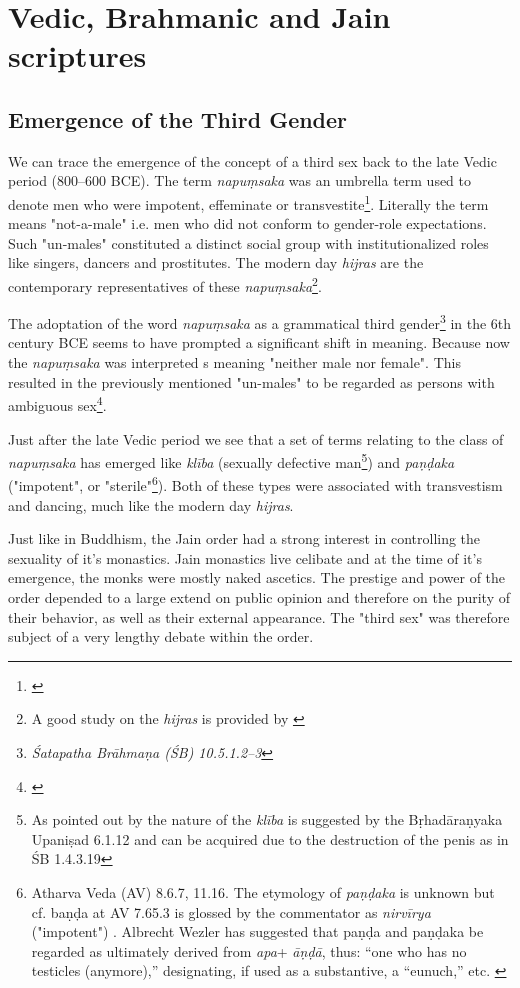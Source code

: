 \section{Vedic, Brahmanic and Jain scriptures}

\subsection{Emergence of the Third Gender}
We can trace the emergence of the concept of a third sex back to the late Vedic period (800–600 BCE). The term {\em napuṃsaka} was an umbrella term used to denote men who were impotent, effeminate or transvestite\footnote{\cite{zwilling}}. Literally the term means "not-a-male" i.e. men who did not conform to gender-role expectations. Such "un-males" constituted a distinct social group with institutionalized roles like singers, dancers and prostitutes. The modern day {\em hijras} are the contemporary representatives of these {\em napuṃsaka}\footnote{A good study on the {\em hijras} is provided by \cite{nanda}}.

The adoptation of the word {\em napuṃsaka} as a grammatical third gender\footnote{{\em Śatapatha Brāhmaṇa (ŚB) 10.5.1.2–3}} in the 6th century BCE seems to have prompted a significant shift in meaning. Because now the {\em napuṃsaka} was interpreted s meaning "neither male nor female". This resulted in the previously mentioned "un-males" to be regarded as persons with ambiguous sex\footnote{\cite{zwilling2000}}.

Just after the late Vedic period we see that a set of terms relating to the class of {\em napuṃsaka} has emerged like {\em klība} (sexually defective man\footnote{As pointed out by \cite{zwilling} the nature of the {\em klība} is suggested by the Bṛhadāraṇyaka Upaniṣad 6.1.12 and can be acquired due to the destruction of the penis as in ŚB 1.4.3.19}) and {\em paṇḍaka} ("impotent", or "sterile"\footnote{Atharva Veda (AV) 8.6.7, 11.16. The etymology of {\em paṇḍaka} is unknown but cf. baṇḍa at AV 7.65.3 is glossed by the commentator as {\em nirvīrya} ("impotent") \cite{zwilling}. Albrecht Wezler has suggested that paṇḍa and paṇḍaka be regarded as ultimately derived from {\em *apa}+ {\em āṇḍā}, thus: “one who has no testicles (anymore),” designating, if used as a substantive, a “eunuch,” etc. \cite{wezler}}). Both of these types were associated with transvestism and dancing, much like the modern day {\em hijras}.

Just like in Buddhism, the Jain order had a strong interest in controlling the sexuality of it's monastics. Jain monastics live celibate and at the time of it's emergence, the monks were mostly naked ascetics. The prestige and power of the order depended to a large extend on public opinion and therefore on the purity of their behavior, as well as their external appearance. The "third sex" was therefore subject of a very lengthy debate within the order. 

